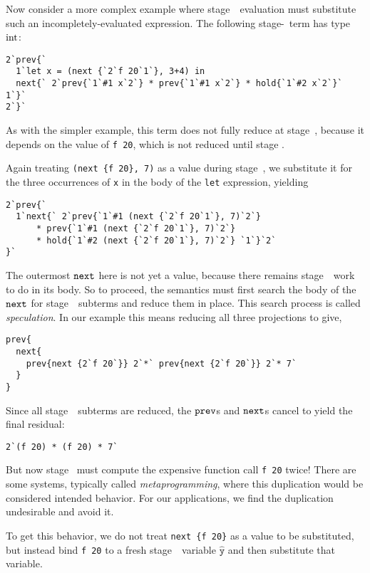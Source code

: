 Now consider a more complex example where stage~\bbone\ evaluation must
substitute such an incompletely-evaluated expression. The following
stage-\bbtwo\ term has type ${\rm int}$:
\begin{lstlisting} 
2`prev{`
  1`let x = (next {`2`f 20`1`}, 3+4) in
  next{` 2`prev{`1`#1 x`2`} * prev{`1`#1 x`2`} * hold{`1`#2 x`2`}` 1`}`
2`}`
\end{lstlisting}
As with the simpler example, this term does not fully reduce at stage~\bbone, 
because it depends on the value of \verb|f 20|, which is not reduced until stage \bbtwo.

Again treating \verb|(next {f 20}, 7)| as a value during stage~\bbone, we
substitute it for the three occurrences of \verb|x| in the body of the
\verb|let| expression, yielding
\begin{lstlisting} 
2`prev{`
  1`next{` 2`prev{`1`#1 (next {`2`f 20`1`}, 7)`2`} 
      * prev{`1`#1 (next {`2`f 20`1`}, 7)`2`} 
      * hold{`1`#2 (next {`2`f 20`1`}, 7)`2`} `1`}`2`
}`
\end{lstlisting}
The outermost ${\tt next}$ here is not yet a value, because there remains stage~\bbone\ work to do in its body.
So to proceed, the semantics must first search the body of the ${\tt next}$ for stage~\bbone\ subterms and reduce them in place.
This search process is called {\em speculation}.
In our example this means reducing all three projections to give,
\begin{lstlisting} 
prev{
  next{ 
    prev{next {2`f 20`}} 2`*` prev{next {2`f 20`}} 2`* 7` 
  }
}
\end{lstlisting}
Since all stage~\bbone\ subterms are reduced, the ${\tt prev}$s and ${\tt next}$s cancel to yield the final residual:
\begin{lstlisting} 
2`(f 20) * (f 20) * 7`
\end{lstlisting}
But now stage \bbtwo\ must compute the expensive function call \verb|f 20| twice! 
There are some systems, typically called {\em metaprogramming}, 
where this duplication would be considered intended behavior.
For our applications, we find the duplication undesirable and avoid it.

To get this behavior, we do not treat \verb|next {f 20}| as a value to be substituted, 
but instead bind \verb|f 20| to a fresh stage~\bbtwo\ variable $\mathtt{\hat y}$
and then substitute that variable.

